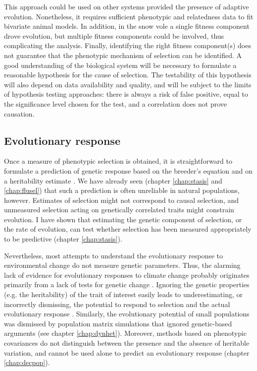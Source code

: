 This approach could be used on other systems provided the presence of adaptive evolution. Nonetheless, it requires sufficient phenotypic and relatedness data to fit bivariate animal models. In addition, in the snow vole a single fitness component drove evolution, but multiple fitness components could be involved, thus complicating the analysis. Finally, identifying the right fitness component(s) does not guarantee that the phenotypic mechanism of selection can be identified. A good understanding of the biological system will be necessary to formulate a reasonable hypothesis for the cause of selection. The testability of this hypothesis will also depend on data availability and quality, and will be subject to the limits of hypothesis testing approaches: there is always a risk of false positive, equal to the significance level chosen for the test, and a correlation does not prove causation.


\subsection{Evolutionary response}
Once a measure of phenotypic selection is obtained, it is straightforward to formulate a prediction of genetic response based on the breeder's equation and on a heritability estimate \parencite{Lush1937, Falconer1996}. We have already seen (chapter \ref{chap:stasis} and \ref{chap:flusel}) that such a prediction is often unreliable in natural populations, however.  Estimates of selection might not correspond to causal selection, and unmeasured selection acting on genetically correlated traits might constrain evolution. I have shown that estimating the genetic component of selection, or the rate of evolution, can test whether selection has been measured appropriately to be predictive (chapter \ref{chap:stasis}). 

Nevertheless, most attempts to understand the evolutionary response to environmental change do not measure genetic parameters. Thus, the alarming lack of evidence for evolutionary responses to climate change probably originates primarily from a lack of tests for genetic change \parencite{Charmantier2014climate,Gienapp2014,Merila2014,Crozier2014}.
Ignoring the genetic properties (e.g. the heritability) of the trait of interest \parencite[e.g.][]{Forcada2014, Coulson2014, traill2014demography} easily leads to underestimating, or incorrectly dismissing, the potential to respond to selection and the actual evolutionary response \parencite{Nietlisbach2015, Chevin2015a, Pigeon2016}.
Similarly, the evolutionary potential of small populations was dismissed by population matrix simulations that ignored genetic-based arguments (see chapter \ref{chap:dynhet}). Moreover, methods based on phenotypic covariances do not distinguish between the presence and the absence of heritable variation, and cannot be used alone to predict an evolutionary response (chapter \ref{chap:decpop}).

